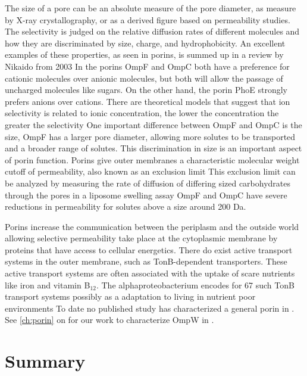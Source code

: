 The size of a pore can be an absolute measure of the pore diameter, as measure
by X-ray crystallography, or as a derived figure based on permeability studies.
The selectivity is judged on the relative diffusion rates of different molecules
and how they are discriminated by size, charge, and hydrophobicity. An excellent
examples of these properties, as seen in \ecoli{} porins, is summed up in a
review by Nikaido from 2003 In \ecoli{} the
porins OmpF and OmpC both have a preference for cationic molecules over anionic
molecules, but both will allow the passage of uncharged molecules like sugars.
On the other hand, the \ecoli{} porin PhoE strongly prefers anions over cations.
There are theoretical models that suggest that ion selectivity is related to
ionic concentration, the lower the concentration the greater the
selectivity One important difference between OmpF and OmpC
is the size, OmpF has a larger pore diameter, allowing more solutes to be
transported and a broader range of solutes. This discrimination in size is an
important aspect of porin function. Porins give outer membranes a characteristic
molecular weight cutoff of permeability, also known as an exclusion
limit This exclusion limit can be analyzed by
measuring the rate of diffusion of differing sized carbohydrates through the
pores in a liposome swelling assay OmpF and OmpC
have severe reductions in permeability for solutes above a size around 200 Da.
 
Porins increase the communication between the periplasm and the outside world allowing selective permeability take place at the cytoplasmic membrane by proteins that have access to cellular energetics. There do exist active transport systems in the outer membrane, such as TonB-dependent transporters. These active transport systems are often associated with the uptake of scare nutrients like iron and vitamin B$_{12}$. The alphaproteobacterium \caulobacter{} encodes for 67 such TonB transport systems possibly as a adaptation to living in nutrient poor environments To date no published study has characterized a general porin in \caulobacter{}. See \cref{ch:porin} on  for our work to characterize OmpW in \caulobacter{}.

  \section{Summary}\label{sec:summary}
  
